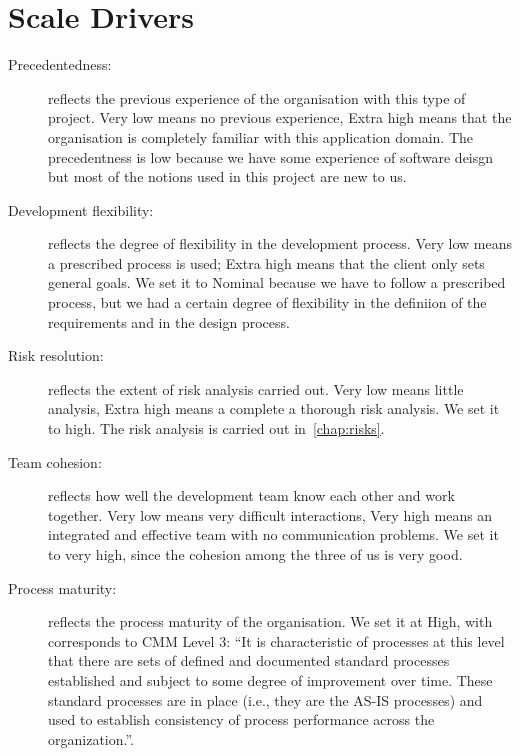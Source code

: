 \section{Scale Drivers}

\begin{description}

    \item[Precedentedness:] reflects the previous experience of the organisation with this type of project. Very low means no previous experience, Extra high means that the organisation is completely familiar with this application domain.
    The precedentness is low because we have some experience of software deisgn but most of the notions used in this project are new to us.

    \item[Development flexibility:] reflects the degree of flexibility in the development process. Very low means a prescribed process is used; Extra high means that the client only sets general goals. We set it to Nominal because we have to follow a prescribed process, but we had a certain degree of flexibility in the definiion of the requirements and in the design process.

    \item[Risk resolution:] reflects the extent of risk analysis carried out. Very low means little analysis, Extra high means a complete a thorough risk analysis. We set it to high. The risk analysis is carried out in~\ref{chap:risks}.

    \item[Team cohesion:] reflects how well the development team know each other and work together. Very low means very difficult interactions, Very high means an integrated and effective team with no communication problems. We set it to very high, since the cohesion among the three of us is very good.

    \item[Process maturity:] reflects the process maturity of the organisation. We set it at High, with corresponds to CMM Level 3: ``It is characteristic of processes at this level that there are sets of defined and documented standard processes established and subject to some degree of improvement over time. These standard processes are in place (i.e., they are the AS-IS processes) and used to establish consistency of process performance across the organization.''.

\end{description}

